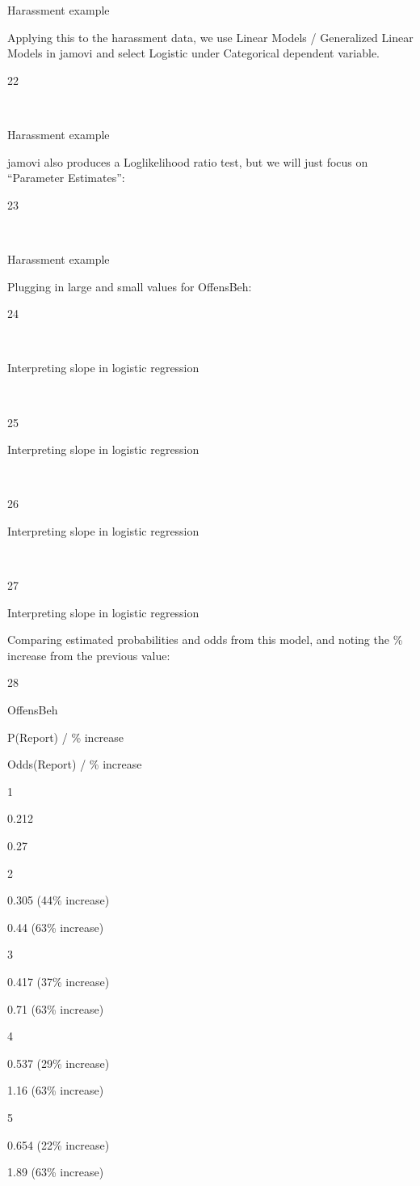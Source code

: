\documentclass[
  letterpaper,
  DIV=11,
  numbers=noendperiod]{scrreprt}
\begin{document}
Harassment example

Applying this to the harassment data, we use Linear Models / Generalized
Linear Models in jamovi and select Logistic under Categorical dependent
variable.

22

~

Harassment example

jamovi also produces a Loglikelihood ratio test, but we will just focus
on ``Parameter Estimates'':

23

~

Harassment example

Plugging in large and small values for OffensBeh:

24

~

Interpreting slope in logistic regression

~

25

Interpreting slope in logistic regression

~

26

Interpreting slope in logistic regression

~

27

Interpreting slope in logistic regression

Comparing estimated probabilities and odds from this model, and noting
the \% increase from the previous value:

28

OffensBeh

P(Report) / \% increase

Odds(Report) / \% increase

1

0.212

0.27

2

0.305 (44\% increase)

0.44 (63\% increase)

3

0.417 (37\% increase)

0.71 (63\% increase)

4

0.537 (29\% increase)

1.16 (63\% increase)

5

0.654 (22\% increase)

1.89 (63\% increase)
\end{document}
